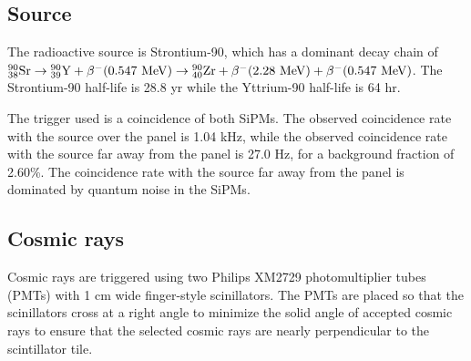 \documentclass[12pt]{article}
\begin{document}
\subsection{Source}

The radioactive source is Strontium-90, which has a dominant decay chain of
$^{90}_{38}{\rm Sr} \rightarrow {}^{90}_{39}{\rm Y} + \beta^-(0.547~{\rm MeV}) \rightarrow
{}^{90}_{40}{\rm Zr} + \beta^-(2.28~{\rm MeV}) + \beta^-(0.547~{\rm MeV})$.  The
Strontium-90 half-life is 28.8 yr while the Yttrium-90 half-life is 64 hr.

The trigger used is a coincidence of both SiPMs.  The observed coincidence rate with the
source over the panel is 1.04 kHz, while the observed coincidence rate with the source far
away from the panel is 27.0 Hz, for a background fraction of 2.60\%.  The coincidence rate
with the source far away from the panel is dominated by quantum noise in the SiPMs.


\subsection{Cosmic rays}

Cosmic rays are triggered using two Philips XM2729 photomultiplier tubes (PMTs) with 1 cm
wide finger-style scinillators.  The PMTs are placed so that the scinillators cross at a
right angle to minimize the solid angle of accepted cosmic rays to ensure that the
selected cosmic rays are nearly perpendicular to the scintillator tile.
\end{document}
